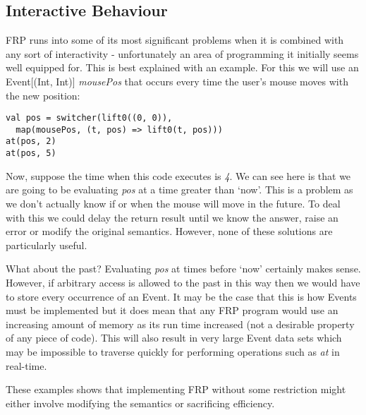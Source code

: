       
    \subsection{Interactive Behaviour}
      FRP runs into some of its most significant problems when it is combined with any
      sort of interactivity - unfortunately an area of programming it initially seems
      well equipped for. This is best explained with an example. For this we will use an 
      Event[(Int, Int)] \emph{mousePos} that occurs every time the user's mouse moves with the new position:

\begin{verbatim}
val pos = switcher(lift0((0, 0)), 
  map(mousePos, (t, pos) => lift0(t, pos)))
at(pos, 2)
at(pos, 5)
\end{verbatim}    

      Now, suppose the time when this code executes is \emph{4}. We can see here
      is that we are going to be evaluating \emph{pos} at a time greater than `now'. This is a problem as we don't
      actually know if or when the mouse will move in the future. To deal with this we could delay the return
      result until we know the answer, raise an error or modify the original semantics. However, none of these solutions are
      particularly useful.
      
      What about the past? Evaluating \emph{pos} at times before `now' certainly makes sense. However, if arbitrary
      access is allowed to the past in this way then we would have to store every occurrence
      of an Event. It may be the case that this is how Events must be implemented but it does
      mean that any FRP program would use an increasing amount of memory as its run time increased (not a 
      desirable property of any piece of code). This will also result in very large Event data sets which
      may be impossible to traverse quickly for performing operations such as \emph{at} in real-time.
      
      These examples shows that implementing FRP without some restriction might either involve modifying the
      semantics or sacrificing efficiency.